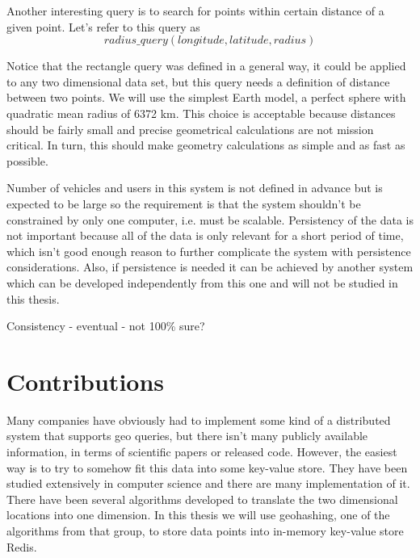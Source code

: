 \documentclass[times, utf8, diplomski]{fer}
\begin{document}
Another interesting query is to search for points within certain distance of a given point.  Let's refer to this query as
$$radius\_query (longitude, latitude, radius)$$

Notice that the rectangle query was defined in a general way, it could be applied to any two dimensional data set, but this query needs a definition of distance between two points. We will use the simplest Earth model, a perfect sphere with quadratic mean radius of 6372 km. This choice is acceptable because distances should be fairly small and precise geometrical calculations are not mission critical. In turn, this should make geometry calculations as simple and as fast as possible.

Number of vehicles and users in this system is not defined in advance but is expected to be large so the requirement is that the system shouldn't be constrained by only one computer, i.e. must be scalable. Persistency of the data is not important because all of the data is only relevant for a short period of time, which isn't good enough reason to further complicate the system with persistence considerations. Also, if persistence is needed it can be achieved by another system which can be developed independently from this one and will not be studied in this thesis. 

Consistency - eventual - not 100\% sure?

\section {Contributions}
Many companies have obviously had to implement some kind of a distributed system that supports geo queries, but there isn't many publicly available information, in terms of scientific papers or released code. However, the easiest way is to try to somehow fit this data into some key-value store. They have been studied extensively in computer science and there are many implementation of it. There have been several algorithms developed to translate the two dimensional locations into one dimension. In this thesis we will use geohashing, one of the algorithms from that group, to store data points into in-memory key-value store Redis.
\end{document}
